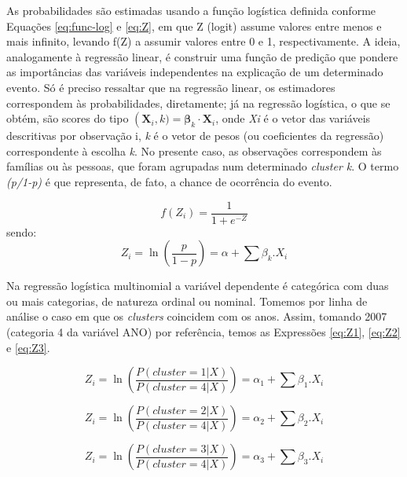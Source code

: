 As probabilidades são estimadas usando a função logística definida conforme Equações \eqref{eq:func-log} e \eqref{eq:Z}, em que Z (logit) assume valores entre menos e mais infinito, levando f(Z) a assumir valores entre 0 e 1, respectivamente. A ideia, analogamente à regressão linear, é construir uma função de predição que pondere as importâncias das variáveis independentes na explicação de um determinado evento. Só é preciso ressaltar que na regressão linear, os estimadores correspondem às probabilidades, diretamente; já na regressão logística, o que se obtém, são scores do tipo $\operatorname(\mathbf{X}_i,k) = \boldsymbol\beta_k \cdot \mathbf{X}_i$,
onde \textit{Xi} é o vetor das variáveis descritivas por observação i, \textit{k} é o vetor de pesos (ou coeficientes da regressão) correspondente à escolha \textit{k}.
No presente caso, as observações correspondem às famílias ou às pessoas, que foram agrupadas num determinado \textit{cluster k}.
O termo \textit{(p/1-p)} é que representa, de fato, a chance de ocorrência do evento. 

\begin{equation}\label{eq:func-log}
f(Z_{i}) = \frac{1}{1+e^{-Z}}
\end{equation}
sendo:
\begin{equation}\label{eq:Z}
Z_{i} = \ln \left( \frac{p}{1 - p} \right) = \alpha + \sum\beta_{k}.X_{i} 
\end{equation}

Na regressão logística multinomial a variável dependente é categórica com duas ou mais categorias, de natureza ordinal ou nominal. Tomemos por linha de análise o caso em que os \textit{clusters} coincidem com os anos. Assim, tomando 2007 (categoria 4 da variável ANO) por referência, temos as Expressões \eqref{eq:Z1}, \eqref{eq:Z2} e \eqref{eq:Z3}.

\begin{equation}\label{eq:Z1}
Z_{i} = \ln \left( \frac{P(cluster=1|X)}{P(cluster=4|X)} \right) = \alpha_{1} + \sum\beta_{1}.X_{i} 
\end{equation}

\begin{equation}\label{eq:Z2}
Z_{i} = \ln \left( \frac{P(cluster=2|X)}{P(cluster=4|X)} \right) = \alpha_{2} + \sum\beta_{2}.X_{i} 
\end{equation}

\begin{equation}\label{eq:Z3}
Z_{i} = \ln \left( \frac{P(cluster=3|X)}{P(cluster=4|X)} \right) = \alpha_{3} + \sum\beta_{3}.X_{i} 
\end{equation}

